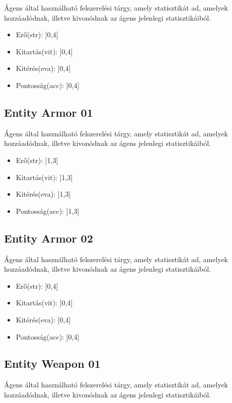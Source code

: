 Ágens által használható felszerelési tárgy, amely statisztikát ad, amelyek hozzáadódnak, illetve kivonódnak az ágens jelenlegi statisztikáiból.

\begin{itemize}
    \item Erő(str): ]0,4]
    \item Kitartás(vit): ]0,4]
    \item Kitérés(eva): ]0,4]
    \item Pontosság(acc): ]0,4]
\end{itemize}

\subsection{Entity Armor 01}

Ágens által használható felszerelési tárgy, amely statisztikát ad, amelyek hozzáadódnak, illetve kivonódnak az ágens jelenlegi statisztikáiból.

\begin{itemize}
    \item Erő(str): ]1,3]
    \item Kitartás(vit): ]1,3]
    \item Kitérés(eva): ]1,3]
    \item Pontosság(acc): ]1,3]
\end{itemize}

\subsection{Entity Armor 02}


Ágens által használható felszerelési tárgy, amely statisztikát ad, amelyek hozzáadódnak, illetve kivonódnak az ágens jelenlegi statisztikáiból.

\begin{itemize}
    \item Erő(str): ]0,4]
    \item Kitartás(vit): ]0,4]
    \item Kitérés(eva): ]0,4]
    \item Pontosság(acc): ]0,4]
\end{itemize}

\subsection{Entity Weapon 01}

Ágens által használható felszerelési tárgy, amely statisztikát ad, amelyek hozzáadódnak, illetve kivonódnak az ágens jelenlegi statisztikáiból.

